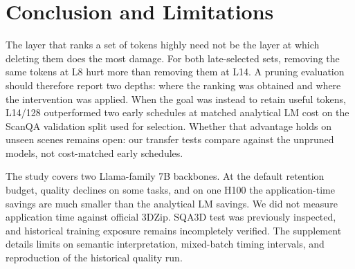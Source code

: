 \section{Conclusion and Limitations}
The layer that ranks a set of tokens highly need not be the layer at which deleting them does the most damage. For both late-selected sets, removing the same tokens at L8 hurt more than removing them at L14. A pruning evaluation should therefore report two depths: where the ranking was obtained and where the intervention was applied. When the goal was instead to retain useful tokens, L14/128 outperformed two early schedules at matched analytical LM cost on the ScanQA validation split used for selection. Whether that advantage holds on unseen scenes remains open: our transfer tests compare against the unpruned models, not cost-matched early schedules.

The study covers two Llama-family 7B backbones. At the default retention budget, quality declines on some tasks, and on one H100 the application-time savings are much smaller than the analytical LM savings. We did not measure application time against official 3DZip. SQA3D test was previously inspected, and historical training exposure remains incompletely verified. The supplement details limits on semantic interpretation, mixed-batch timing intervals, and reproduction of the historical quality run.\label{maintext:end}
